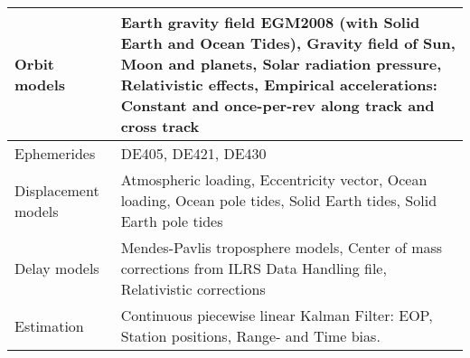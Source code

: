 \color{black}
\begin{tabularx}{\columnwidth}{l|X}
  Orbit models & Earth gravity field EGM2008 (with Solid Earth and Ocean Tides),
  Gravity field of Sun, Moon and planets, Solar radiation pressure, Relativistic effects, Empirical accelerations: Constant and once-per-rev along track and cross track \\
  \hline
  Ephemerides & DE405, DE421, DE430 \\
  \hline
  Displacement models & Atmospheric loading, Eccentricity vector, Ocean loading,
  Ocean pole tides, Solid Earth tides, Solid Earth pole tides \\
  \hline
  Delay models & Mendes-Pavlis troposphere models, Center of mass corrections from ILRS Data Handling file, Relativistic corrections\\
  \hline
  Estimation & Continuous piecewise linear Kalman Filter: EOP, Station positions, Range- and Time bias. 
\end{tabularx}

\endinput

